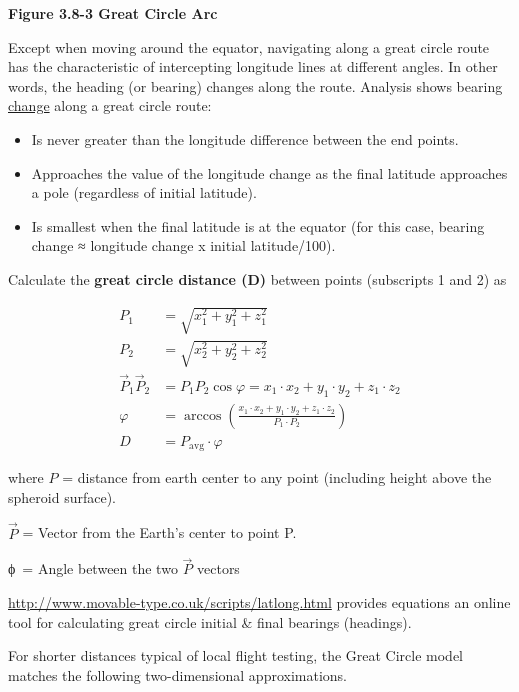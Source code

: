 \documentclass[
]{book}
\providecommand{\tightlist}{%
  \setlength{\itemsep}{0pt}\setlength{\parskip}{0pt}}
\begin{document}
\textbf{Figure 3.8-3 Great Circle Arc}

Except when moving around the equator, navigating along a great circle route has the characteristic of intercepting longitude lines at different angles. In other words, the heading (or bearing) changes along the route. Analysis shows bearing \underline{change} along a great circle route:

\begin{itemize}
\tightlist
\item
  Is never greater than the longitude difference between the end points.
\item
  Approaches the value of the longitude change as the final latitude approaches a pole (regardless of initial latitude).
\item
  Is smallest when the final latitude is at the equator (for this case, bearing change ≈ longitude change x initial latitude/100).
\end{itemize}

Calculate the \textbf{great circle distance (D)} between points (subscripts 1 and 2) as

\begin{align}
P_{1} &= \sqrt{x_{1}^{2} + y_{1}^{2} + z_{1}^{2}} \\
P_{2} &= \sqrt{x_{2}^{2} + y_{2}^{2} + z_{2}^{2}} \\
\overset{\rightarrow}{P}_{1}  \overset{\rightarrow}P_{2} &= P_{1} P_{2}\cos{\varphi} = x_{1} \cdot x_{2} + y_{1} \cdot y_{2} + z_{1} \cdot z_{2} \\
\varphi &= \arccos\left( \frac{x_{1} \cdot x_{2} + y_{1} \cdot y_{2} + z_{1} \cdot z_{2}}{P_{1} \cdot P_{2}} \right) \\
D &= P_{\mathrm{avg}} \cdot \varphi
\end{align}

where
\(P\) = distance from earth center to any point (including height above the spheroid surface).

\(\overset{\rightarrow}{P}\) = Vector from the Earth's center to point P.

ϕ~= Angle between the two \(\overset{\rightarrow}{P}\) vectors

\url{http://www.movable-type.co.uk/scripts/latlong.html} provides equations an online tool for calculating great circle initial \& final bearings (headings).

For shorter distances typical of local flight testing, the Great Circle model matches the following two-dimensional approximations.
\end{document}
